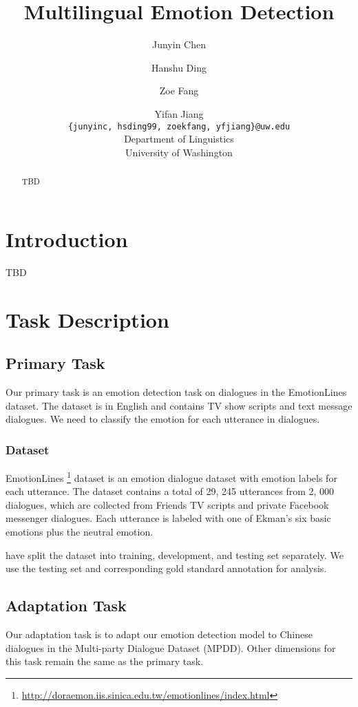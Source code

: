 \documentclass[11pt,a4paper]{article}
\title{Multilingual Emotion Detection}
\author{Junyin Chen \and Hanshu Ding \and Zoe Fang \and Yifan Jiang \\
		\texttt{\{junyinc, hsding99, zoekfang, yfjiang\}@uw.edu} \\
        Department of Linguistics \\ University of Washington}
\date{}
\begin{document}
\maketitle
\begin{abstract}
TBD
\end{abstract}

\section{Introduction}

TBD


\section{Task Description}
\subsection{Primary Task}
\label{sect:primary_task}

Our primary task is an emotion detection task on dialogues in the EmotionLines dataset. The dataset is in English and contains TV show scripts and text message dialogues. We need to classify the emotion for each utterance in dialogues.

\subsubsection{Dataset}

EmotionLines \citep{hsu-etal-2018-emotionlines}\footnote{\url{http://doraemon.iis.sinica.edu.tw/emotionlines/index.html}} dataset is an emotion dialogue dataset with emotion labels for each utterance. The dataset contains a total of 29, 245 utterances from 2, 000 dialogues, which are collected from Friends TV scripts and private Facebook messenger dialogues. Each utterance is labeled with one of Ekman’s six basic emotions plus the neutral emotion.

\citet{hsu-etal-2018-emotionlines} have split the dataset into training, development, and testing set separately. We use the testing set and corresponding gold standard annotation for analysis.

\subsection{Adaptation Task}
\label{sect:adaptation_task}

Our adaptation task is to adapt our emotion detection model to Chinese dialogues in the Multi-party Dialogue Dataset (MPDD). Other dimensions for this task remain the same as the primary task.
\end{document}
